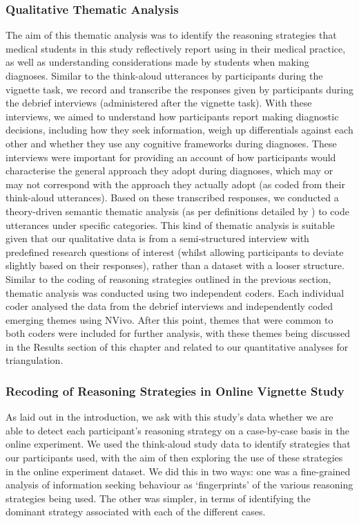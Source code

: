\documentclass[a4paper, nobind]{templates/ociamthesis}
\begin{document}
\subsubsection{Qualitative Thematic Analysis}\label{qualitative-thematic-analysis}

The aim of this thematic analysis was to identify the reasoning strategies that medical students in this study reflectively report using in their medical practice, as well as understanding considerations made by students when making diagnoses. Similar to the think-aloud utterances by participants during the vignette task, we record and transcribe the responses given by participants during the debrief interviews (administered after the vignette task). With these interviews, we aimed to understand how participants report making diagnostic decisions, including how they seek information, weigh up differentials against each other and whether they use any cognitive frameworks during diagnoses. These interviews were important for providing an account of how participants would characterise the general approach they adopt during diagnoses, which may or may not correspond with the approach they actually adopt (as coded from their think-aloud utterances). Based on these transcribed responses, we conducted a theory-driven semantic thematic analysis (as per definitions detailed by \textcite{braun_using_2006}) to code utterances under specific categories. This kind of thematic analysis is suitable given that our qualitative data is from a semi-structured interview with predefined research questions of interest (whilst allowing participants to deviate slightly based on their responses), rather than a dataset with a looser structure. Similar to the coding of reasoning strategies outlined in the previous section, thematic analysis was conducted using two independent coders. Each individual coder analysed the data from the debrief interviews and independently coded emerging themes using NVivo. After this point, themes that were common to both coders were included for further analysis, with these themes being discussed in the Results section of this chapter and related to our quantitative analyses for triangulation.

\subsubsection{Recoding of Reasoning Strategies in Online Vignette Study}\label{recoding-of-reasoning-strategies-in-online-vignette-study}

As laid out in the introduction, we ask with this study's data whether we are able to detect each participant's reasoning strategy on a case-by-case basis in the online experiment. We used the think-aloud study data to identify strategies that our participants used, with the aim of then exploring the use of these strategies in the online experiment dataset. We did this in two ways: one was a fine-grained analysis of information seeking behaviour as `fingerprints' of the various reasoning strategies being used. The other was simpler, in terms of identifying the dominant strategy associated with each of the different cases.\\
\end{document}
